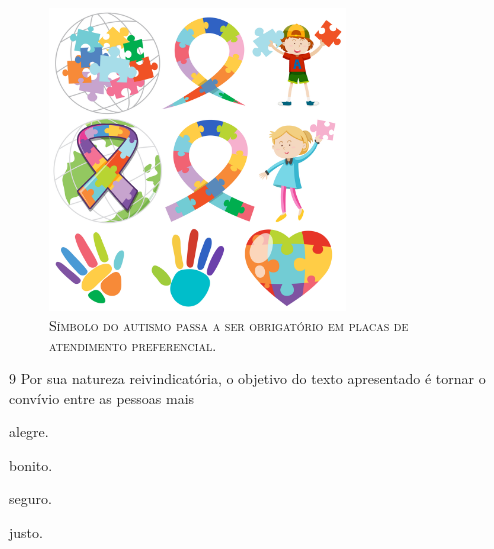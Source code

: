 \begin{figure}[H]
\centering\includegraphics[width=0.7\textwidth]{./imgSAEB_6_POR/freepik/PORT_6_IMG-12.jpeg}
\caption{\textsc{Símbolo do autismo passa a ser obrigatório em placas de atendimento
preferencial.}}
\end{figure}


\num{9}  Por sua natureza reivindicatória, o objetivo do texto apresentado é
tornar o convívio entre as pessoas mais

\begin{multicols}{2}
\begin{escolha}
\item alegre.
\item bonito.
\item seguro.
\item justo. 
\end{escolha}
\end{multicols}


